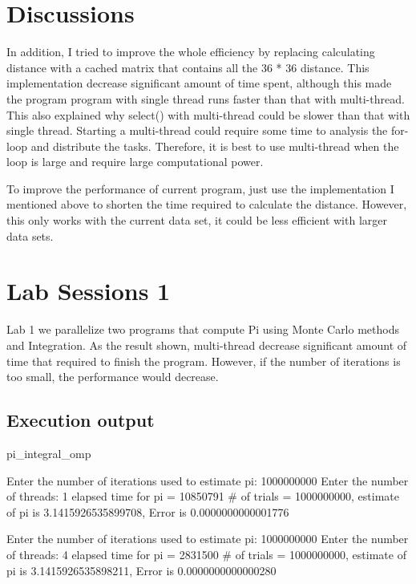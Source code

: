 \documentclass[11pt, letterpaper]{article}
\begin{document}
	
	\section {Discussions}
	In addition, I tried to improve the whole efficiency by replacing calculating distance with a cached matrix that contains all the 36 * 36 distance. This implementation decrease significant amount of time spent, although this made the program program with single thread runs faster than that with multi-thread. This also explained why select() with multi-thread could be slower than that with single thread. Starting a multi-thread could require some time to analysis the for-loop and distribute the tasks. Therefore, it is best to use multi-thread when the loop is large and require large computational power. \par To improve the performance of current program, just use the implementation I mentioned above to shorten the time required to calculate the distance. However, this only works with the current data set, it could be less efficient with larger data sets.
	
	\section {Lab Sessions 1}
	Lab 1 we parallelize two programs that compute Pi using Monte Carlo methods and Integration. As the result shown, multi-thread decrease significant amount of time that required to finish the program. However, if the number of iterations is too small, the performance would decrease.
	
	\subsection{Execution output }
	\noindent \large pi\_integral\_omp
	
	
	\begin{small}	
		
		\noindent Enter the number of iterations used to estimate pi: 1000000000\newline
		Enter the number of threads: 1\newline
		elapsed time for pi = 10850791\newline
		\# of trials = 1000000000, estimate of pi is  3.1415926535899708, Error is 0.0000000000001776\newline
		
		\noindent Enter the number of iterations used to estimate pi: 1000000000 \newline
		Enter the number of threads: 4 \newline
		elapsed time for pi = 2831500 \newline
		\# of trials = 1000000000, estimate of pi is  3.1415926535898211, Error is 0.0000000000000280 \newline
		
	\end{small}
	
\end{document}
